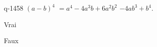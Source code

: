 \begin{truefalse}{q-1458}
$(a-b)^4$ $=a^4-4a^3b+6a^2b^2$ $-4ab^3+b^4$.
\item* Vrai
\item Faux
\end{truefalse}

